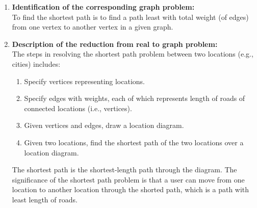 \documentclass[article, 10pt,onecolumn]{article}
\begin{document}
\begin{enumerate}
\begin{enumerate}
   \item \textbf{Identification of the corresponding graph problem:}\\
    To find the shortest path is to find a path least with
    total weight (of edges) from one vertex to another vertex in a given graph.
   \item \textbf{Description of the reduction from real to graph problem:}\\
    The steps in resolving the shortest path problem between two locations (e.g., cities) includes: 
    \begin{enumerate}
	    \item Specify vertices representing locations.
	    \item Specify edges with weights, each of which represents length of roads of connected locations (i.e., vertices).
	    \item Given vertices and edges, draw a location diagram.
	    \item Given two locations, find the shortest path of the two locations over a location diagram.
    \end{enumerate}
    The shortest path is the shortest-length path through the diagram. The significance of the shortest path problem is that a user
    can move from one location to another location through the shorted path, which is a path with least length of roads.
   
\end{enumerate}
 

\end{enumerate}
\end{document}
